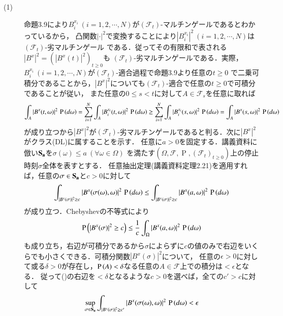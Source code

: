 \begin{prf}
\begin{description}\mbox{}
	\item[(1)] 命題3.9により$B_i^{x_i}\ (i = 1,2,\cdots,N)$が$(\mathcal{F}_t)$-マルチンゲールであるとわかっているから，
		凸関数$|\cdot|^2$で変換することにより$\left|B_i^{x_i}\right|^2\ (i = 1,2,\cdots,N)$は$(\mathcal{F}_t)$-劣マルチンゲール
		である．従ってその有限和で表される$|B^x|^2 = \left(\left|B^x(t)\right|^2\right)_{t \geq 0}$も
		$(\mathcal{F}_t)$-劣マルチンゲールである．実際，$B_i^{x_i}\ (i = 1,2,\cdots,N)$が$(\mathcal{F}_t)$-適合過程で命題3.9より任意の$t \geq 0$
		で二乗可積分であることから，$|B^x|^2$についても$(\mathcal{F}_t)$-適合で任意の$t \geq 0$で可積分であることが従い，
		また任意の$0 \leq s < t$に対して$A \in \mathcal{F}_s$を任意に取れば
		\begin{align}
			\int_{A} |B^x(t,\omega)|^2\, \operatorname{P} \left(d\omega\right) 
			= \sum_{i=1}^{N} \int_{A} |B_i^{x_i}(t,\omega)|^2\, \operatorname{P} \left(d\omega\right) 
			\geq \sum_{i=1}^{N} \int_{A} |B_i^{x_i}(s,\omega)|^2\, \operatorname{P} \left(d\omega\right) 
			= \int_{A} |B^x(s,\omega)|^2\, \operatorname{P} \left(d\omega\right) 
		\end{align}
		が成り立つから$|B^x|^2$が$(\mathcal{F}_t)$-劣マルチンゲールであると判る．次に$|B^x|^2$がクラス(DL)に属することを示す．
		任意に$a > 0$を固定する．講義資料に倣い$\bf{S}_a$を$\sigma(\omega) \leq a\ (\forall \omega \in \Omega)$
		を満たす$(\Omega, \mathcal{F}, \operatorname{P}, (\mathcal{F}_t)_{t \geq 0})$上の停止時刻$\sigma$全体を表すとする．
		任意抽出定理(講義資料定理2.21)を適用すれば，任意の$\sigma \in \bf{S}_a$と$c > 0$に対して
		\begin{align}
			\int_{|B^x(\sigma)|^2 \geq c} |B^x(\sigma(\omega), \omega)|^2\, \operatorname{P} \left(d\omega\right)
			\leq \int_{|B^x(\sigma)|^2 \geq c} |B^x(a, \omega)|^2\, \operatorname{P} \left(d\omega\right)
		\end{align}
		が成り立つ．Chebyshevの不等式により
		\begin{align}
			\operatorname{P} \left(|B^x(\sigma)|^2 \geq c\right) \leq \frac{1}{c} \int_{\Omega} |B^x(a, \omega)|^2\, \operatorname{P} \left(d\omega\right) \label{eq:stoc_report_Q2}
		\end{align}
		も成り立ち，右辺が可積分であるから$\sigma$によらずに$c$の値のみで右辺をいくらでも小さくできる．可積分関数$|B^x(\sigma)|^2$について，
		任意の$\epsilon > 0$に対して或る$\delta > 0$が存在し，$\operatorname{P} \left(A\right) < \delta$なる任意の$A \in \mathcal{F}$上での積分は$< \epsilon$となる．
		従って()の右辺を$ < \delta$となるような$c > 0$を選べば，全ての$c' > c$に対して
		\begin{align}
			\sup{\sigma \in \bf{S}_a}{\int_{|B^x(\sigma)|^2 \geq c'} |B^x(\sigma(\omega), \omega)|^2\, \prob{d\omega}} < \epsilon

\end{align}
\end{description}
\end{prf}
